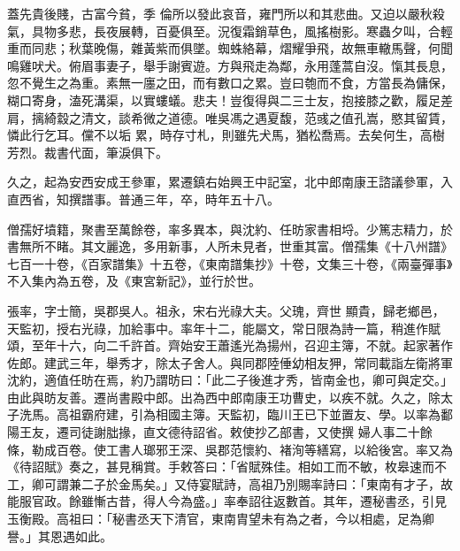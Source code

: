 \begin{pinyinscope}
 蓋先貴後賤，古富今貧，季
 倫所以發此哀音，雍門所以和其悲曲。又迫以嚴秋殺氣，具物多悲，長夜展轉，百憂俱至。況復霜銷草色，風搖樹影。寒蟲夕叫，合輕重而同悲；秋葉晚傷，雜黃紫而俱墜。蜘蛛絡幕，熠耀爭飛，故無車轍馬聲，何聞鳴雞吠犬。俯眉事妻子，舉手謝賓遊。方與飛走為鄰，永用蓬蒿自沒。愾其長息，忽不覺生之為重。素無一廛之田，而有數口之累。豈曰匏而不食，方當長為傭保，糊口寄身，溘死溝渠，以實螻蟻。悲夫！豈復得與二三士友，抱接膝之歡，履足差肩，摛綺縠之清文，談希微之道德。唯吳馮之遇夏馥，范彧之值孔嵩，愍其留賃，憐此行乞耳。儻不以垢
 累，時存寸札，則雖先犬馬，猶松喬焉。去矣何生，高樹芳烈。裁書代面，筆淚俱下。



 久之，起為安西安成王參軍，累遷鎮右始興王中記室，北中郎南康王諮議參軍，入直西省，知撰譜事。普通三年，卒，時年五十八。



 僧孺好墳籍，聚書至萬餘卷，率多異本，與沈約、任昉家書相埒。少篤志精力，於書無所不睹。其文麗逸，多用新事，人所未見者，世重其富。僧孺集《十八州譜》七百一十卷，《百家譜集》十五卷，《東南譜集抄》十卷，文集三十卷，《兩臺彈事》不入集內為五卷，及《東宮新記》，並行於世。



 張率，字士簡，吳郡吳人。祖永，宋右光祿大夫。父瑰，齊世
 顯貴，歸老鄉邑，天監初，授右光祿，加給事中。率年十二，能屬文，常日限為詩一篇，稍進作賦頌，至年十六，向二千許首。齊始安王蕭遙光為揚州，召迎主簿，不就。起家著作佐郎。建武三年，舉秀才，除太子舍人。與同郡陸倕幼相友狎，常同載詣左衛將軍沈約，適值任昉在焉，約乃謂昉曰：「此二子後進才秀，皆南金也，卿可與定交。」由此與昉友善。遷尚書殿中郎。出為西中郎南康王功曹史，以疾不就。久之，除太子洗馬。高祖霸府建，引為相國主簿。天監初，臨川王已下並置友、學。以率為鄱陽王友，遷司徒謝朏掾，直文德待詔省。敕使抄乙部書，又使撰
 婦人事二十餘條，勒成百卷。使工書人瑯邪王深、吳郡范懷約、褚洵等繕寫，以給後宮。率又為《待詔賦》奏之，甚見稱賞。手敕答曰：「省賦殊佳。相如工而不敏，枚皋速而不工，卿可謂兼二子於金馬矣。」又侍宴賦詩，高祖乃別賜率詩曰：「東南有才子，故能服官政。餘雖慚古昔，得人今為盛。」率奉詔往返數首。其年，遷秘書丞，引見玉衡殿。高祖曰：「秘書丞天下清官，東南胄望未有為之者，今以相處，足為卿譽。」其恩遇如此。




\end{pinyinscope}
